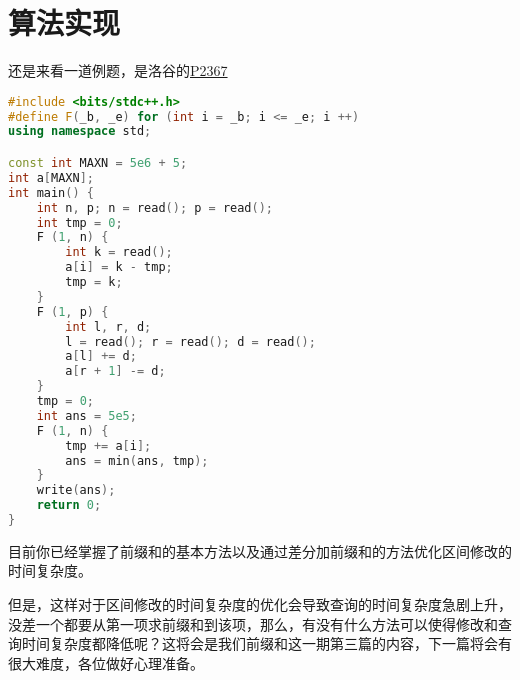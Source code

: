 \chapter{算法实现}
还是来看一道例题，是洛谷的\href{https://www.luogu.com.cn/problem/P2367}{P2367}\par
\begin{lstlisting}[language=cpp]
#include <bits/stdc++.h>
#define F(_b, _e) for (int i = _b; i <= _e; i ++)
using namespace std;

const int MAXN = 5e6 + 5;
int a[MAXN];
int main() {
    int n, p; n = read(); p = read();
    int tmp = 0;
    F (1, n) {
        int k = read();
        a[i] = k - tmp;
        tmp = k;
    }
    F (1, p) {
        int l, r, d;
        l = read(); r = read(); d = read();
        a[l] += d;
        a[r + 1] -= d;
    }
    tmp = 0;
    int ans = 5e5;
    F (1, n) {
        tmp += a[i];
        ans = min(ans, tmp);
    }
    write(ans);
    return 0;
}
\end{lstlisting}
目前你已经掌握了前缀和的基本方法以及通过差分加前缀和的方法优化区间修改的时间复杂度。\par
但是，这样对于区间修改的时间复杂度的优化会导致查询的时间复杂度急剧上升，没差一个都要从第一项求前缀和到该项，那么，有没有什么方法可以使得修改和查询时间复杂度都降低呢？这将会是我们前缀和这一期第三篇的内容，下一篇将会有很大难度，各位做好心理准备。\par
